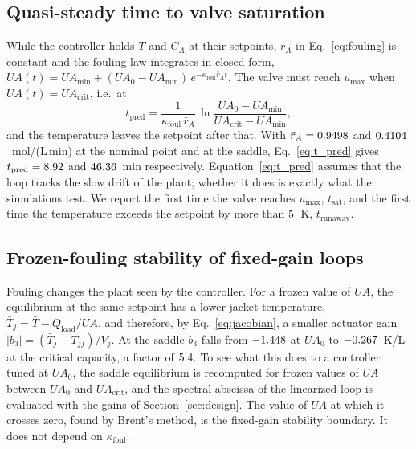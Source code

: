 \subsection{Quasi-steady time to valve saturation}
While the controller holds $T$ and $C_A$ at their setpoints, $r_A$ in Eq.~\eqref{eq:fouling} is constant and the fouling law integrates in closed form, $UA(t)=UA_{\min}+(UA_0-UA_{\min})\,e^{-\kappa_{\mathrm{foul}}\bar r_At}$. The valve must reach $u_{\max}$ when $UA(t)=UA_{\mathrm{crit}}$, i.e.\ at
\begin{equation}
t_{\mathrm{pred}} = \frac{1}{\kappa_{\mathrm{foul}}\,\bar r_A}\,\ln\frac{UA_0-UA_{\min}}{UA_{\mathrm{crit}}-UA_{\min}},
\label{eq:t_pred}
\end{equation}
and the temperature leaves the setpoint after that. With $\bar r_A=0.9498$ and $0.4104$~mol/(L\,min) at the nominal point and at the saddle, Eq.~\eqref{eq:t_pred} gives $t_{\mathrm{pred}}=8.92$ and $46.36$~min respectively. Equation~\eqref{eq:t_pred} assumes that the loop tracks the slow drift of the plant; whether it does is exactly what the simulations test. We report the first time the valve reaches $u_{\max}$, $t_{\mathrm{sat}}$, and the first time the temperature exceeds the setpoint by more than $5$~K, $t_{\mathrm{runaway}}$.

\subsection{Frozen-fouling stability of fixed-gain loops}
Fouling changes the plant seen by the controller. For a frozen value of $UA$, the equilibrium at the same setpoint has a lower jacket temperature, $\bar T_j=\bar T-Q_{\mathrm{load}}/UA$, and therefore, by Eq.~\eqref{eq:jacobian}, a smaller actuator gain $|b_3|=(\bar T_j-T_{jf})/V_j$. At the saddle $b_3$ falls from $-1.448$ at $UA_0$ to $-0.267$~K/L at the critical capacity, a factor of $5.4$. To see what this does to a controller tuned at $UA_0$, the saddle equilibrium is recomputed for frozen values of $UA$ between $UA_0$ and $UA_{\mathrm{crit}}$, and the spectral abscissa of the linearized loop is evaluated with the gains of Section~\ref{sec:design}. The value of $UA$ at which it crosses zero, found by Brent's method, is the fixed-gain stability boundary. It does not depend on $\kappa_{\mathrm{foul}}$.
